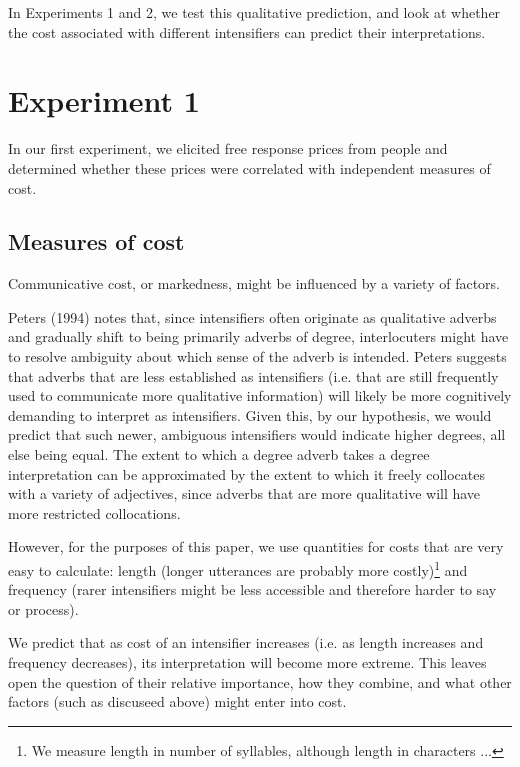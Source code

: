 \documentclass[10pt,letterpaper]{article}
\begin{document}
In Experiments 1 and 2, we test this qualitative prediction, and look at whether the cost associated with different intensifiers can predict their interpretations.

\section{Experiment 1}

In our first experiment, we elicited free response prices from people and determined whether these prices were correlated with independent measures of cost.

\subsection{Measures of cost}

Communicative cost, or markedness,
might be influenced by a variety of factors.

Peters (1994) notes that, since intensifiers often originate as qualitative adverbs and gradually shift to being primarily adverbs of degree, interlocuters might have to resolve ambiguity about which sense of the adverb is intended. Peters suggests that adverbs that are less established as intensifiers (i.e. that are still frequently used to communicate more qualitative information) will likely be more cognitively demanding to interpret as intensifiers. Given this, by our hypothesis, we would predict that such newer, ambiguous intensifiers would indicate higher degrees, all else being equal. %
The extent to which a degree adverb takes a degree interpretation can be approximated by the extent to which it freely collocates with a variety of adjectives, since adverbs that are more qualitative will have more restricted collocations.

However, for the purposes of this paper, we use quantities for costs that are very easy to calculate: length (longer utterances are probably more costly)\footnote{We measure length in number of syllables, although length in characters ...} and frequency (rarer intensifiers might be less accessible and therefore harder to say or process).

We predict that as cost of an intensifier increases (i.e. as length increases and frequency decreases), its interpretation will become more extreme. This leaves open the question of their relative importance, how they combine, and what other factors (such as discuseed above) might enter into cost.
\end{document}
